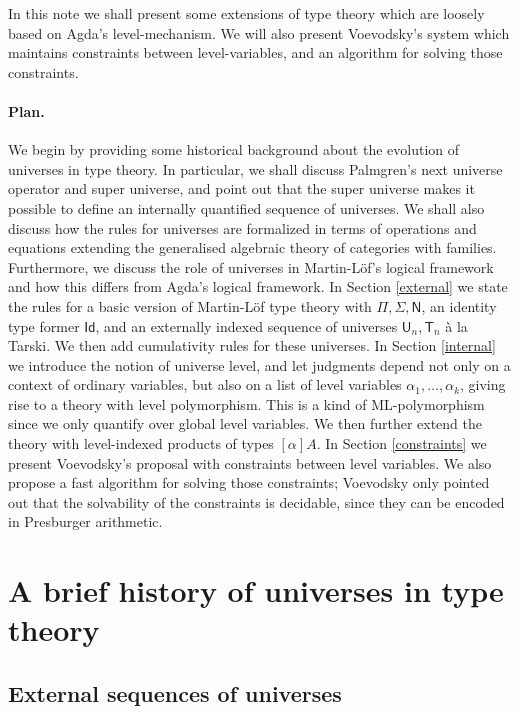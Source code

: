 \documentclass[11pt,a4paper]{article}
\newcommand{\Id}{\mathsf{Id}}
\def\NN{\mathsf{N}}
\def\UU{\mathsf{U}}
\newcommand{\T}{\mathsf{T}}
\begin{document}
In this note we shall present some extensions of type theory which are loosely based on Agda's level-mechanism. We will also present Voevodsky's system \cite{VV} which maintains constraints between level-variables, and an algorithm for solving those constraints.

\paragraph{Plan.} We begin by providing some historical background about the evolution of universes in type theory. In particular, we shall discuss Palmgren's next universe operator and super universe, and point out that the super universe makes it possible to define an internally quantified sequence of universes. We shall also discuss how the rules for universes are formalized in terms of operations and equations extending the generalised algebraic theory of categories with families. Furthermore, we discuss the role of universes in Martin-Löf's logical framework and how this differs from Agda's logical framework. In Section \ref{external} we state the rules for a basic version of Martin-Löf type theory with $\Pi, \Sigma, \NN$, an identity type former $\Id$, and an externally indexed sequence of universes $\UU_n, \T_n$ \`a la Tarski. We then add cumulativity rules for these universes. In Section \ref{internal} we introduce the notion of universe level, and let judgments depend not only on a context of ordinary variables, but also on a list of level variables $\alpha_1, \ldots, \alpha_k$, giving rise to a theory with level polymorphism. This is a kind of ML-polymorphism since we only quantify over global level variables. We then further extend the theory with level-indexed products of types $[\alpha]A$. In Section \ref{constraints} we present Voevodsky's proposal with constraints between level variables. We also propose a fast algorithm for solving those constraints; Voevodsky only pointed out that the solvability of the constraints is decidable, since they can be encoded in Presburger arithmetic.

\section{A brief history of universes in type theory}

\subsection{External sequences of universes}\label{palmgren}
\end{document}
